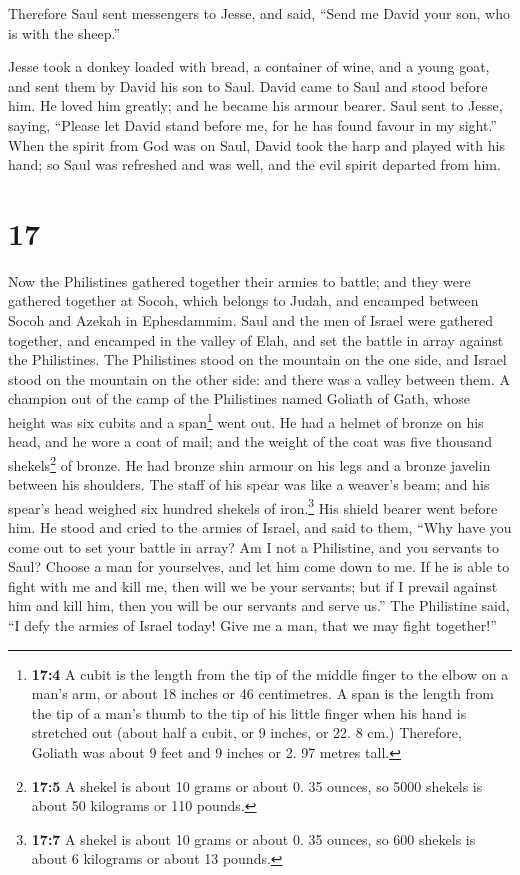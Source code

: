  Therefore Saul sent messengers to Jesse, and said,
``Send me David your son, who is with the sheep.''

 Jesse took a donkey loaded with bread, a container of
wine, and a young goat, and sent them by David his son to Saul.
 David came to Saul and stood before him. He loved him
greatly; and he became his armour bearer.  Saul sent to
Jesse, saying, ``Please let David stand before me, for he has found
favour in my sight.''  When the spirit from God was on
Saul, David took the harp and played with his hand; so Saul was
refreshed and was well, and the evil spirit departed from him.

\hypertarget{section-16}{%
\section{17}\label{section-16}}

 Now the Philistines gathered together their armies to
battle; and they were gathered together at Socoh, which belongs to
Judah, and encamped between Socoh and Azekah in Ephesdammim.
 Saul and the men of Israel were gathered together, and
encamped in the valley of Elah, and set the battle in array against the
Philistines.  The Philistines stood on the mountain on the
one side, and Israel stood on the mountain on the other side: and there
was a valley between them.  A champion out of the camp of
the Philistines named Goliath of Gath, whose height was six cubits and a
span\footnote{\textbf{17:4} A cubit is the length from the tip of the
  middle finger to the elbow on a man's arm, or about 18 inches or 46
  centimetres. A span is the length from the tip of a man's thumb to the
  tip of his little finger when his hand is stretched out (about half a
  cubit, or 9 inches, or 22. 8 cm.) Therefore, Goliath was about 9 feet
  and 9 inches or 2. 97 metres tall.} went out.  He had a
helmet of bronze on his head, and he wore a coat of mail; and the weight
of the coat was five thousand shekels\footnote{\textbf{17:5} A shekel is
  about 10 grams or about 0. 35 ounces, so 5000 shekels is about 50
  kilograms or 110 pounds.} of bronze.  He had bronze shin
armour on his legs and a bronze javelin between his shoulders.
 The staff of his spear was like a weaver's beam; and his
spear's head weighed six hundred shekels of iron.\footnote{\textbf{17:7}
  A shekel is about 10 grams or about 0. 35 ounces, so 600 shekels is
  about 6 kilograms or about 13 pounds.} His shield bearer went before
him.  He stood and cried to the armies of Israel, and said
to them, ``Why have you come out to set your battle in array? Am I not a
Philistine, and you servants to Saul? Choose a man for yourselves, and
let him come down to me.  If he is able to fight with me
and kill me, then will we be your servants; but if I prevail against him
and kill him, then you will be our servants and serve us.''
 The Philistine said, ``I defy the armies of Israel
today! Give me a man, that we may fight together!''

